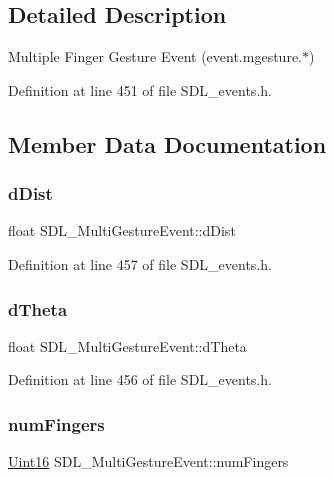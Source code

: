 \subsection{Detailed Description}
Multiple Finger Gesture Event (event.\+mgesture.$\ast$) 

Definition at line 451 of file S\+D\+L\+\_\+events.\+h.



\subsection{Member Data Documentation}
\mbox{\label{struct_s_d_l___multi_gesture_event_a351c29785c5ce3f68c4591a427265f14}} 
\subsubsection{\texorpdfstring{dDist}{dDist}}
{\footnotesize\ttfamily float S\+D\+L\+\_\+\+Multi\+Gesture\+Event\+::d\+Dist}



Definition at line 457 of file S\+D\+L\+\_\+events.\+h.

\mbox{\label{struct_s_d_l___multi_gesture_event_a4f4a920dcf5205baa24a140df56f3153}} 
\subsubsection{\texorpdfstring{dTheta}{dTheta}}
{\footnotesize\ttfamily float S\+D\+L\+\_\+\+Multi\+Gesture\+Event\+::d\+Theta}



Definition at line 456 of file S\+D\+L\+\_\+events.\+h.

\mbox{\label{struct_s_d_l___multi_gesture_event_a6b06cf80372ce3cad40110fdb6ef0353}} 
\subsubsection{\texorpdfstring{numFingers}{numFingers}}
{\footnotesize\ttfamily \mbox{\hyperlink{_s_d_l__stdinc_8h_a31fcc0a076c9068668173ee26d33e42b}{Uint16}} S\+D\+L\+\_\+\+Multi\+Gesture\+Event\+::num\+Fingers}



